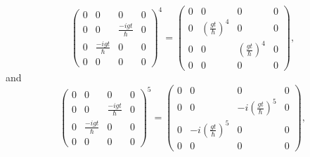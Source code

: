 \documentclass{article}
\begin{document}
\begin{equation}\label{eq 4.27}
     \begin{pmatrix}
            0& 0& 0& 0\\0& 0& \frac{-igt}{\hbar}& 0\\
            0& \frac{-igt}{\hbar}& 0& 0\\ 0& 0& 0& 0
        \end{pmatrix}^4
        =\begin{pmatrix}
            0& 0& 0& 0\\0&  (\frac{gt}{\hbar})^4& 0& 0\\
            0& 0& (\frac{gt}{\hbar})^4&  0\\ 0& 0& 0& 0
        \end{pmatrix}, \tag{4.27}
\end{equation}
and
\begin{equation} \label{eq 4.28}
     \begin{pmatrix}
            0& 0& 0& 0\\0& 0& \frac{-igt}{\hbar}& 0\\
            0& \frac{-igt}{\hbar}& 0& 0\\ 0& 0& 0& 0
        \end{pmatrix}^5
        =\begin{pmatrix}
            0& 0& 0& 0\\0& 0& -i(\frac{gt}{\hbar})^5& 0\\
            0& -i(\frac{gt}{\hbar})^5& 0& 0\\ 0& 0& 0& 0
        \end{pmatrix}, \tag{4.28}
\end{equation}
\end{document}
